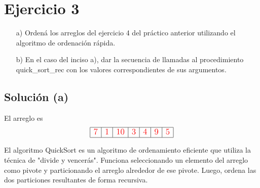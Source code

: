 \section{Ejercicio 3}
\begin{itemize}
\item[a)] Ordená los arreglos del ejercicio 4 del práctico anterior utilizando el algoritmo de ordenación rápida.
\item[b)] En el caso del inciso a), dar la secuencia de llamadas al procedimiento quick\_sort\_rec con los valores correspondientes de sus argumentos.
\end{itemize}

\subsection{Solución (a)}
El arreglo es
\begin{equation*}
  \large
  \begin{array}{|r|r|r|r|r|r|r|}
    \hline \textcolor{red}{7} & \textcolor{red}{1} & \textcolor{red}{10} & \textcolor{red}{3} & \textcolor{red}{4} & \textcolor{red}{9} & \textcolor{red}{5} \\ \hline
  \end{array}
\end{equation*}

El algoritmo QuickSort es un algoritmo de ordenamiento eficiente que utiliza la técnica de "divide y vencerás". Funciona seleccionando un elemento del arreglo como pivote y particionando el arreglo alrededor de ese pivote. Luego, ordena las dos particiones resultantes de forma recursiva.

